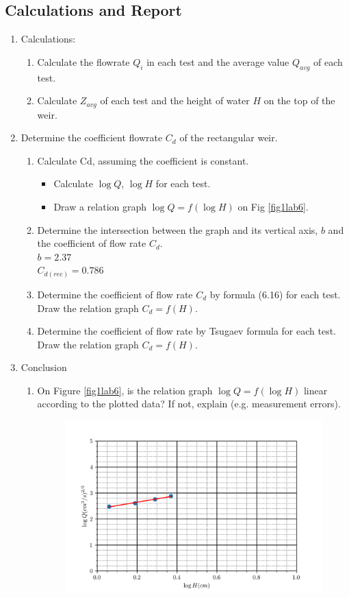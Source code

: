 \subsection{Calculations and Report}
\begin{enumerate}[label=\textbf{\Alph*.}]
	\item Calculations:
	\begin{enumerate}
		\item Calculate the flowrate $Q_i$ in each test and the average value $Q_{avg}$ of each test.
		\item Calculate $Z_{avg}$ of each test and the height of water $H$ on the top of the weir.
	\end{enumerate}
	\item Determine the coefficient flowrate $C_d$ of the rectangular weir.
	\begin{enumerate}
		\item Calculate Cd, assuming the coefficient is constant.
		\begin{itemize}[label=-]
			\item Calculate $\log Q$, $\log H$ for each test.
			\item Draw a relation graph $\log Q = f(\log H)$ on Fig \ref{fig1lab6}.
		\end{itemize}
		\item Determine the intersection between the graph and its vertical axis, $b$ and the coefficient of flow rate $C_d$.\\
		$b=2.37$\\$C_{d(rec)}=0.786$
		\item Determine the coefficient of flow rate $C_d$ by formula (6.16) for each test. Draw the relation graph $C_d=f(H)$.
		\item Determine the coefficient of flow rate by Tsugaev formula for each test. Draw the relation graph $C_d=f(H)$.
	\end{enumerate}
	\item Conclusion
	\begin{enumerate}
		\item On Figure \ref{fig1lab6}, is the relation graph $\log Q = f(\log H)$ linear according to the plotted data? If not, explain (e.g. measurement errors).
		\begin{figure}[H]
			\centering
			\includegraphics[width=150mm]{photos/fig1lab6.png}

\end{figure}
\end{enumerate}
\end{enumerate}
